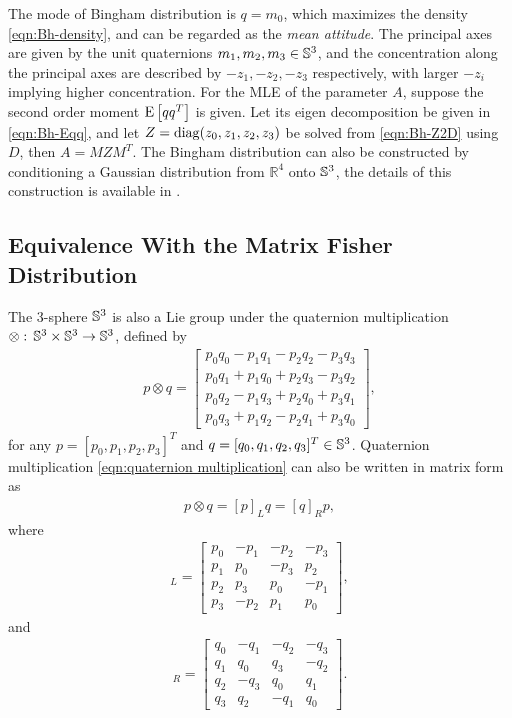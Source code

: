 The mode of Bingham distribution is $q = m_0$, which maximizes the density \eqref{eqn:Bh-density}, and can be regarded as the \textit{mean attitude}.
The principal axes are given by the unit quaternions $m_1,m_2,m_3\in\mathbb{S}^3$, and the concentration along the principal axes are described by $-z_1,-z_2,-z_3$ respectively, with larger $-z_i$ implying higher concentration.
For the MLE of the parameter $A$, suppose the second order moment $\mathrm{E}\left[ qq^T \right]$ is given.
Let its eigen decomposition be given in \eqref{eqn:Bh-Eqq}, and let $Z = \mathrm{diag}(z_0,z_1,z_2,z_3)$ be solved from \eqref{eqn:Bh-Z2D} using $D$, then $A = MZM^T$.
The Bingham distribution can also be constructed by conditioning a Gaussian distribution from $\mathbb{R}^4$ onto $\mathbb{S}^3$, the details of this construction is available in \cite{bingham1974antipodally}.

\subsection{Equivalence With the Matrix Fisher Distribution}

The 3-sphere $\mathbb{S}^3$ is also a Lie group under the quaternion multiplication $\otimes:\, \mathbb{S}^3\times \mathbb{S}^3 \to \mathbb{S}^3$, defined by
\begin{align} \label{eqn:quaternion multiplication}
	p \otimes q = \begin{bmatrix} p_0q_0 - p_1q_1 - p_2q_2 - p_3q_3 \\ p_0q_1 + p_1q_0 + p_2q_3 - p_3q_2 \\ p_0q_2 - p_1q_3 + p_2q_0 + p_3q_1 \\ p_0q_3 + p_1q_2 - p_2q_1 + p_3q_0 \end{bmatrix},
\end{align}
for any $p = [p_0,p_1,p_2,p_3]^T$ and $q = [q_0,q_1,q_2,q_3]^T \in\mathbb{S}^3$.
Quaternion multiplication \eqref{eqn:quaternion multiplication} can also be written in matrix form as
\begin{align}
	p\otimes q = [p]_Lq = [q]_Rp,
\end{align}
where
\begin{align}
	[p]_L = \begin{bmatrix} p_0 & -p_1 & -p_2 & -p_3 \\ p_1 & p_0 & -p_3 & p_2 \\ p_2 & p_3 & p_0 & -p_1 \\ p_3 & -p_2 & p_1 & p_0 \end{bmatrix},
\end{align}
and
\begin{align}
	[q]_R = \begin{bmatrix} q_0 & -q_1 & -q_2 & -q_3 \\ q_1 & q_0 & q_3 & -q_2 \\ q_2 & -q_3 & q_0 & q_1 \\ q_3 & q_2 & -q_1 & q_0 \end{bmatrix}.
\end{align}


